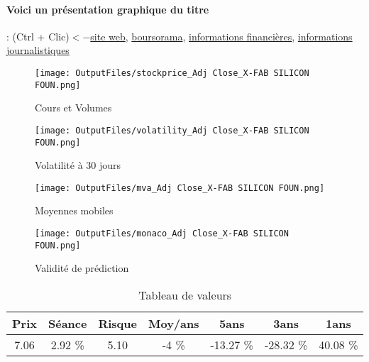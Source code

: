 \documentclass[11pt,a4paper]{report}%
\begin{document}
\paragraph{Voici un présentation graphique du titre} : (Ctrl + Clic)$<-$\href{https://www.xfab.com/about-x-fab/investors/}{site web}, \href{https://www.boursorama.com/cours/1rPXFAB}{boursorama}, \href{https://www.qwant.com/?q=site:https:%2f%2fwww.easybourse.com%2faction-societe%2fX-FAB-SILICON-FOUN&t=web&client=ext-firefox-hp}{informations financières}, \href{https://bourse.lerevenu.com/cours-de-bourse/fiche-valeur-synthese/X-FAB-SILICON-FOUN/XFAB-FR}{informations journalistiques}
\begin{figure}[!htb]
   \begin{minipage}{0.5\textwidth}
     \centering
     \texttt{[image: OutputFiles/stockprice\_Adj Close\_X-FAB SILICON FOUN.png]}
     \caption{Cours et Volumes}\label{Fig:price_X-FAB SILICON FOUN}
   \end{minipage}\hfill
   \begin{minipage}{0.5\textwidth}
     \centering
     \texttt{[image: OutputFiles/volatility\_Adj Close\_X-FAB SILICON FOUN.png]}
     \caption{Volatilité à 30 jours}\label{Fig:volat_X-FAB SILICON FOUN}
   \end{minipage}
\end{figure}
\begin{figure}[!htb]
   \begin{minipage}{0.5\textwidth}
     \centering
     \texttt{[image: OutputFiles/mva\_Adj Close\_X-FAB SILICON FOUN.png]}
     \caption{Moyennes mobiles}\label{Fig:mva_X-FAB SILICON FOUN}
   \end{minipage}\hfill
   \begin{minipage}{0.5\textwidth}
     \centering
     \texttt{[image: OutputFiles/monaco\_Adj Close\_X-FAB SILICON FOUN.png]}
     \caption{Validité de prédiction}\label{Fig:prediction_X-FAB SILICON FOUN}
   \end{minipage}
\end{figure}

\begin{table}[H]
  \centering
    \begin{tabular}{|c|c|c|c|c|c|c|}
    \hline
    Prix & Séance & Risque  & Moy/ans & 5ans & 3ans & 1ans \\
    \hline
    7.06 &    2.92 \%    & 5.10 & -4 \% & -13.27 \% & -28.32 \% & 40.08 \% \\
    \hline
    \end{tabular}%
        \label{tab:table_X-FAB SILICON FO40.08}%
      \caption{Tableau de valeurs}
\end{table}%
\end{document}
